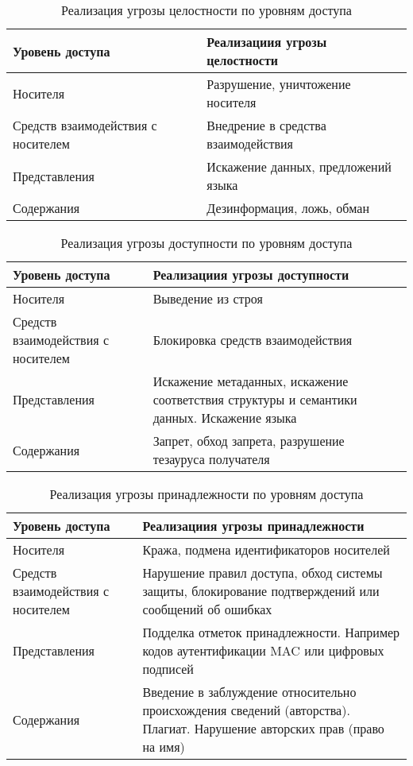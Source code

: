 \begin{table}[ht]
\caption{Реализация угрозы целостности по уровням доступа}
\label{t:integrThreatByLevels}
\centering
\begin{tabular}[c]{|p{5cm}|p{9cm}|}

\hline\hline
Уровень доступа&Реализациия угрозы целостности\\ 
\hline\hline
Носителя& Разрушение, уничтожение носителя\\ \hline
Средств взаимодействия с носителем& Внедрение в средства взаимодействия\\ \hline
Представления& Искажение данных, предложений языка\\ \hline
Содержания& Дезинформация, ложь, обман\\ \hline

\end{tabular}
\end{table}


\begin{table}[ht]
\caption{Реализация угрозы доступности по уровням доступа}
\label{t:accessThreatByLevels}
\centering
\begin{tabular}[c]{|p{5cm}|p{9cm}|}

\hline\hline
Уровень доступа&Реализациия угрозы доступности\\ 
\hline\hline
Носителя& Выведение из строя\\ \hline
Средств взаимодействия с носителем& Блокировка средств взаимодействия\\ \hline
Представления& Искажение метаданных, искажение соответствия структуры и семантики данных. Искажение языка\\ \hline
Содержания& Запрет, обход запрета, разрушение тезауруса получателя\\ \hline

\end{tabular}
\end{table}


\begin{table}[ht]
\caption{Реализация угрозы принадлежности по уровням доступа}
\label{t:ownerThreatByLevels}
\centering
\begin{tabular}[c]{|p{5cm}|p{9cm}|}

\hline\hline
Уровень доступа&Реализациия угрозы принадлежности\\ 
\hline\hline
Носителя& Кража, подмена идентификаторов носителей\\ \hline
Средств взаимодействия с носителем& Нарушение правил доступа, обход системы защиты, блокирование подтверждений или сообщений об ошибках\\ \hline
Представления& Подделка отметок принадлежности. Например кодов аутентификации MAC или цифровых подписей\\ \hline
Содержания& Введение в заблуждение относительно происхождения сведений (авторства). Плагиат. Нарушение авторских прав (право на имя)\\ \hline

\end{tabular}
\end{table}



